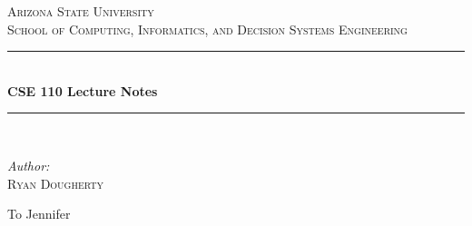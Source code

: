 \documentclass{llncs}
\newcommand{\HRule}{\rule{\linewidth}{0.5mm}}
\newenvironment{dedication}
  {\clearpage           %
   \thispagestyle{empty}%
   \vspace*{\stretch{1}}%
   \itshape             %
   \raggedleft          %
  }
  {\par %
   \vspace{\stretch{3}} %
   \clearpage           %
  }
\begin{document}
\begin{center}

\textsc{\LARGE Arizona State University}\\[1.5cm]

\textsc{\Large School of Computing, Informatics, and Decision Systems Engineering}\\[0.5cm]

\HRule \\[0.4cm]
{ \huge \bfseries CSE 110 Lecture Notes \\[0.4cm] }

\HRule \\[1.5cm]

\begin{minipage}{0.4\textwidth}
\begin{center} \large
\emph{Author:}\\
\textsc{Ryan Dougherty}
\end{center}
\end{minipage}
\begin{minipage}{0.4\textwidth}
\end{minipage}

\vfill


\end{center}
\newpage

\begin{dedication}
To Jennifer
\end{dedication}

%
\newpage
\newpage
\newpage
\newpage
\newpage
\newpage
\newpage
\newpage
\newpage
\newpage
\newpage

\end{document}
